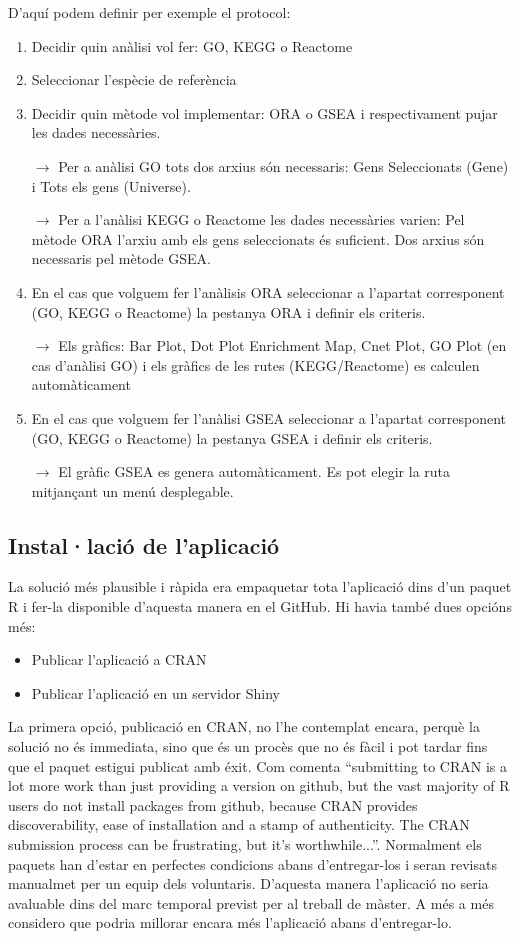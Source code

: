 D'aquí podem definir per exemple el protocol:
\begin{enumerate}
\item Decidir quin anàlisi vol fer: GO, KEGG o Reactome
\item Seleccionar l'espècie de referència
\item Decidir quin mètode vol implementar: ORA o GSEA i respectivament pujar les dades necessàries.

$\rightarrow$ Per a anàlisi GO tots dos arxius són necessaris: Gens Seleccionats (Gene) i Tots els gens (Universe). 

$\rightarrow$ Per a l'anàlisi KEGG o Reactome les dades necessàries varien: Pel mètode ORA l'arxiu amb els gens seleccionats és suficient. Dos arxius són necessaris pel mètode GSEA.
\item En el cas que volguem fer l'anàlisis ORA seleccionar a l'apartat corresponent (GO, KEGG o Reactome) la pestanya ORA i definir els criteris.

$\rightarrow$ Els gràfics: Bar Plot, Dot Plot Enrichment Map, Cnet Plot, GO Plot (en cas d'anàlisi GO) i els gràfics de les rutes (KEGG/Reactome) es calculen automàticament

\item En el cas que volguem fer l'anàlisi GSEA seleccionar a l'apartat corresponent (GO, KEGG o Reactome) la pestanya GSEA i definir els criteris.

$\rightarrow$ El gràfic GSEA es genera automàticament. Es pot elegir la ruta mitjançant un menú desplegable.

\end{enumerate}


\subsection{Instal·lació de l'aplicació}

La solució més plausible i ràpida era empaquetar tota l'aplicació dins d'un paquet R i fer-la disponible d'aquesta manera en el GitHub. Hi havia també dues opcións més: 

\begin{itemize}
\item Publicar l'aplicació a CRAN
\item Publicar l'aplicació en un servidor Shiny
\end{itemize}
La primera opció, publicació en CRAN, no l’he contemplat encara, perquè la solució no és immediata, sino que és un procès que no és fàcil i pot tardar fins que el paquet estigui
 publicat amb éxit. Com comenta \cite{HWick} \enquote{submitting to CRAN is a lot more work than just providing a version on github, but the vast majority of R users do not install packages from github, because CRAN provides discoverability, ease of installation and a stamp of authenticity. The CRAN submission process can be frustrating, but it’s worthwhile...}. Normalment els paquets han d’estar en perfectes condicions abans d'entregar-los i seran revisats manualmet per un equip dels voluntaris. D'aquesta manera l'aplicació no seria avaluable dins del marc temporal previst per al treball de màster. A més a més considero que podria millorar encara més l'aplicació abans d'entregar-lo.

